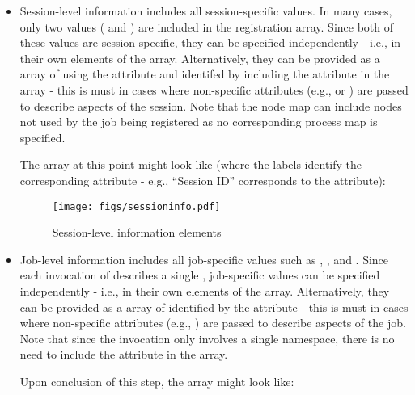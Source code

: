 \begin{itemize}
\item Session-level information includes all session-specific values. In many cases, only two values ( and ) are included in the registration array. Since both of these values are session-specific, they can be specified independently - i.e., in their own  elements of the  array. Alternatively, they can be provided as a  array of  using the  attribute and identifed by including the  attribute in the array - this is must in cases where non-specific attributes (e.g.,  or ) are passed to describe aspects of the session. Note that the node map can include nodes not used by the job being registered as no corresponding process map is specified.

The  array at this point might look like (where the labels identify the corresponding attribute - e.g., ``Session ID'' corresponds to the  attribute):

\begingroup
\begin{figure*}[ht!]
  \begin{center}
    \texttt{[image: figs/sessioninfo.pdf]}
  \end{center}
  \caption{Session-level information elements}
  \label{fig:sessioninfo}
\end{figure*}
\endgroup


\item Job-level information includes all job-specific values such as , , and . Since each invocation of  describes a single , job-specific values can be specified independently - i.e., in their own  elements of the  array. Alternatively, they can be provided as a  array of  identified by the  attribute - this is must in cases where non-specific attributes (e.g., ) are passed to describe aspects of the job. Note that since the invocation only involves a single namespace, there is no need to include the  attribute in the array.

Upon conclusion of this step, the  array might look like:


\end{itemize}
